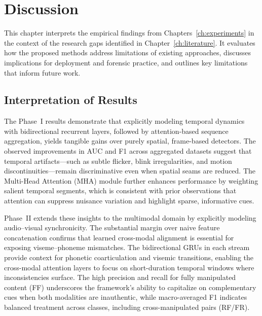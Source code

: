 \chapter{Discussion}
\label{ch:discussion}

This chapter interprets the empirical findings from Chapters~\ref{ch:experiments} in the context of the research gaps identified in Chapter~\ref{ch:literature}. It evaluates how the proposed methods address limitations of existing approaches, discusses implications for deployment and forensic practice, and outlines key limitations that inform future work.

\section{Interpretation of Results}
The Phase~I results demonstrate that explicitly modeling temporal dynamics with bidirectional recurrent layers, followed by attention-based sequence aggregation, yields tangible gains over purely spatial, frame-based detectors. The observed improvements in AUC and F1 across aggregated datasets suggest that temporal artifacts---such as subtle flicker, blink irregularities, and motion discontinuities---remain discriminative even when spatial seams are reduced. The Multi-Head Attention (MHA) module further enhances performance by weighting salient temporal segments, which is consistent with prior observations that attention can suppress nuisance variation and highlight sparse, informative cues.

Phase~II extends these insights to the multimodal domain by explicitly modeling audio--visual synchronicity. The substantial margin over naive feature concatenation confirms that learned cross-modal alignment is essential for exposing viseme--phoneme mismatches. The bidirectional GRUs in each stream provide context for phonetic coarticulation and visemic transitions, enabling the cross-modal attention layers to focus on short-duration temporal windows where inconsistencies surface. The high precision and recall for fully manipulated content (FF) underscores the framework's ability to capitalize on complementary cues when both modalities are inauthentic, while macro-averaged F1 indicates balanced treatment across classes, including cross-manipulated pairs (RF/FR).

